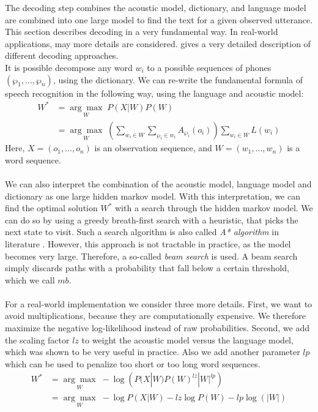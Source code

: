 The decoding step combines the acoustic model, dictionary, and language model are combined into one large model to find the text for a given observed utterance. This section describes decoding in a very fundamental way. In real-world applications, may more details are considered.  \cite{huang2001spoken} gives a very detailed description of different decoding approaches.\\
It is possible decompose any word $w_i$ to a possible sequences of phones $(\wp_1, ..., \wp_n)$, using the dictionary. We can re-write the fundamental formula of speech recognition in the following way, using the language and acoustic model:
\begin{align*}
W^* &= \underset{W}{\arg \max} \; P(X|W) P(W) \\
&= \underset{W}{\arg \max} \; \left( \sum_{w_i \in W} \sum_{\wp_i \in w_i} A_{\wp_i}(o_i) \right) \sum_{w_i \in W} L(w_i)
\end{align*}
Here, $X = (o_1, ..., o_n)$ is an observation sequence, and $W = (w_1, ..., w_n)$ is a word sequence. \\ \\ 
We can also interpret the combination of the acoustic model, language model and dictionary as one large hidden markov model. With this interpretation, we can find the optimal solution $W^*$ with a search through the hidden markov model. We can do so by using a greedy breath-first search with a heuristic, that picks the next state to visit. Such a search algorithm is also called \textit{A* algorithm} in literature \cite{hart1968formal}. However, this approach is not tractable in practice, as the model becomes very large. Therefore, a so-called \textit{beam search} is used. A beam search simply discards paths with a probability that fall below a certain threshold, which we call $mb$. \\ \\
For a real-world implementation we consider three more details. First, we want to avoid multiplications, because they are computationally expensive. We therefore maximize the negative log-likelihood instead of raw probabilities. Second, we add the scaling factor $lz$ to weight the acoustic model versus the language model, which was shown to be very useful in practice. Also we add another parameter $lp$ which can be used to penalize too short or too long word sequences. 
\begin{align*}
W^* &= \underset{W}{\arg \max} \; -\log\left(P(X|W) P(W)^{lz} |W|^{lp} \right) \\
&= \underset{W}{\arg \max} \; -\log P(X|W) - lz\log P(W) -lp\log(|W|) 
\end{align*}

